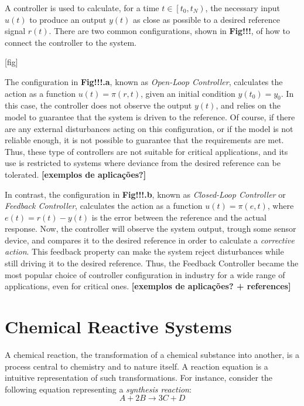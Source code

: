 \documentclass[a4paper,11pt]{book}
\numberwithin{figure}{chapter}
\numberwithin{equation}{chapter}
\numberwithin{table}{chapter}
\theoremstyle{definition}
\begin{document}
A controller is used to calculate, for a time $t \in \left[ t_0, t_N\right)$, the necessary input $u(t)$ to produce an output $y(t)$ as close as possible to a desired reference signal $r(t)$. There are two common configurations, shown in \textbf{Fig!!!}, of how to connect the controller to the system.

[fig]

The configuration in \textbf{Fig!!!.a}, known as \textit{Open-Loop Controller}, calculates the action as a function $u(t) = \pi(r, t)$, given an initial condition $y(t_0) = y_0$. In this case, the controller does not observe the output $y(t)$, and relies on the model to guarantee that the system is driven to the reference. Of course, if there are any external disturbances acting on this configuration, or if the model is not reliable enough, it is not possible to guarantee that the requirements are met. Thus, these type of controllers are not suitable for critical applications, and its use is restricted to systems where deviance from the desired reference can be tolerated. \textbf{[exemplos de aplicações?]}

In contrast, the configuration in \textbf{Fig!!!.b}, known as \textit{Closed-Loop Controller} or \textit{Feedback Controller}, calculates the action as a function $u(t) = \pi(e, t)$, where $e(t) = r(t) - y(t)$ is the error between the reference and the actual response. Now, the controller will observe the system output, trough some sensor device, and compares it to the desired reference in order to calculate a \textit{corrective action}. This feedback property can make the system reject disturbances while still driving it to the desired reference. Thus, the Feedback Controller became the most popular choice of controller configuration in industry for a wide range of applications, even for critical ones.  \textbf{[exemplos de aplicações? + references]}

\section{Chemical Reactive Systems}

A chemical reaction, the transformation of a chemical substance into another, is a process central to chemistry and to nature itself. A reaction equation is a intuitive representation of such transformations. For instance, consider the following equation representing a \textit{synthesis reaction}:
\begin{equation}
    A + 2 B \longrightarrow 3 C + D 
\end{equation} 
\end{document}
